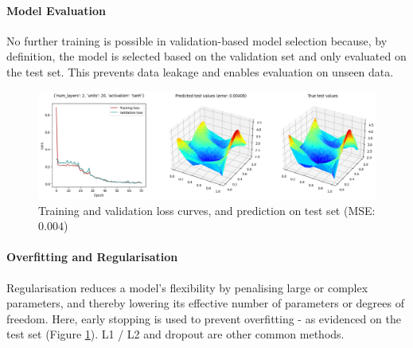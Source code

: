 \paragraph{Model Evaluation}

No further training is possible in validation-based model selection because, by definition, the model is selected based on the validation set and only evaluated on the test set.
This prevents data leakage and enables evaluation on unseen data.

\begin{figure}[h!]
    \includegraphics[width=\textwidth]{figures/regression-results.png}
    \caption{Training and validation loss curves, and prediction on test set (MSE: $0.004$)}
    \label{fig:regression-results}
\end{figure}
\vspace{-10pt}

\paragraph{Overfitting and Regularisation}

Regularisation reduces a model's flexibility by penalising large or complex parameters, and
thereby lowering its effective number of parameters or degrees of freedom.
Here, early stopping is used to prevent overfitting - as evidenced on the test set (Figure \ref{fig:regression-results}).
L1 / L2 and dropout are other common methods.
